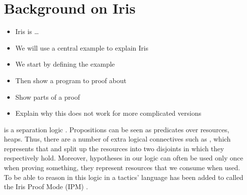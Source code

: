 \documentclass[thesis.tex]{subfiles}
\begin{document}
\chapter{Background on Iris}

\begin{itemize}
  \item Iris is \ldots
  \item We will use a central example to explain Iris
  \item We start by defining the example
  \item Then show a program to proof about
  \item Show parts of a proof
  \item Explain why this does not work for more complicated versions
\end{itemize}

\iris is a separation logic \cite*{jungIrisMonoidsInvariants2015a,jungHigherorderGhostState2016,krebbersEssenceHigherOrderConcurrent2017,jungIrisGroundModular2018}. Propositions can be seen as predicates over resources, \eg heaps. Thus, there are a number of extra logical connectives such as , which represents that  and  split up the resources into two disjoints in which they respectively hold. Moreover, hypotheses in our logic can often be used only once when proving something, they represent resources that we consume when used. To be able to reason in this logic in \coq a tactics' language has been added to \coq called the Iris Proof Mode (IPM) \cite*{krebbersInteractiveProofsHigherorder2017,krebbersMoSeLGeneralExtensible2018}.
\end{document}
